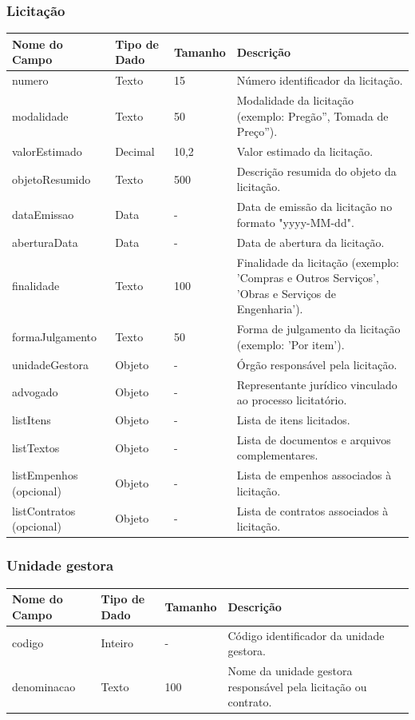 \documentclass[
	12pt,				%
	oneside,			%
	a4paper,			%
	chapter=TITLE,		%
	section=TITLE,		%
	english,			%
	brazil				%
	]{abntex2}
\begin{document}
\subsubsection*{Licitação}
\begin{longtable}{|p{4cm}|p{3cm}|p{2cm}|p{6cm}|}
\hline
\textbf{Nome do Campo} & \textbf{Tipo de Dado} & \textbf{Tamanho} & \textbf{Descrição} \\
\hline
numero & Texto & 15 & Número identificador da licitação. \\
\hline
modalidade & Texto & 50 & Modalidade da licitação (exemplo: Pregão'', Tomada de Preço''). \\
\hline
valorEstimado & Decimal & 10,2 & Valor estimado da licitação. \\
\hline
objetoResumido & Texto & 500 & Descrição resumida do objeto da licitação. \\
\hline
dataEmissao & Data & - & Data de emissão da licitação no formato "yyyy-MM-dd". \\
\hline
aberturaData & Data & - & Data de abertura da licitação. \\
\hline
finalidade & Texto & 100 & Finalidade da licitação (exemplo: 'Compras e Outros Serviços', 'Obras e Serviços de Engenharia'). \\
\hline
formaJulgamento & Texto & 50 & Forma de julgamento da licitação (exemplo: 'Por item'). \\
\hline
unidadeGestora & Objeto & - & Órgão responsável pela licitação. \\
\hline
advogado & Objeto & - & Representante jurídico vinculado ao processo licitatório. \\
\hline
listItens & Objeto & - & Lista de itens licitados. \\
\hline
listTextos & Objeto & - & Lista de documentos e arquivos complementares. \\
\hline
listEmpenhos (opcional) & Objeto & - & Lista de empenhos associados à licitação. \\
\hline
listContratos (opcional) & Objeto & - & Lista de contratos associados à licitação. \\
\hline
\end{longtable}

\subsubsection*{Unidade gestora}
\begin{longtable}{|p{4cm}|p{3cm}|p{2cm}|p{6cm}|}
\hline
\textbf{Nome do Campo} & \textbf{Tipo de Dado} & \textbf{Tamanho} & \textbf{Descrição} \\
\hline
codigo & Inteiro & - & Código identificador da unidade gestora. \\
\hline
denominacao & Texto & 100 & Nome da unidade gestora responsável pela licitação ou contrato. \\
\hline
\end{longtable}
\end{document}
